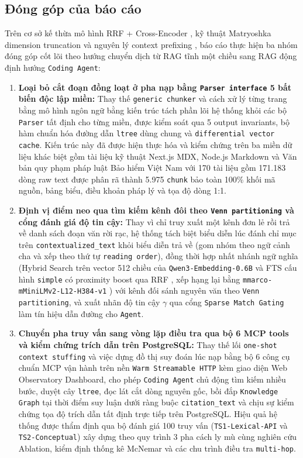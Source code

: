 \subsection{Đóng góp của báo cáo}
Trên cơ sở kế thừa mô hình RRF + Cross-Encoder \cite{cormack2009rrf, nogueira2019bert, wang2021minilm}, kỹ thuật Matryoshka dimension truncation \cite{kusupati2022mrl} và nguyên lý context prefixing \cite{anthropic2024contextual}, báo cáo thực hiện ba nhóm đóng góp cốt lõi theo hướng chuyển dịch từ RAG tĩnh một chiều sang RAG động định hướng \texttt{Coding Agent}:
\begin{enumerate}
    \item \textbf{Loại bỏ cắt đoạn đồng loạt ở pha nạp bằng \texttt{Parser interface} 5 bất biến độc lập miền:} Thay thế \texttt{generic chunker} và cách xử lý từng trang bằng mô hình ngôn ngữ bằng kiến trúc tách phần lõi hệ thống khỏi các bộ \texttt{Parser} tất định cho từng miền, được kiểm soát qua 5 output invariants, bộ hàm chuẩn hóa đường dẫn \texttt{ltree} dùng chung và \texttt{differential vector cache}. Kiến trúc này đã được hiện thực hóa và kiểm chứng trên ba miền dữ liệu khác biệt gồm tài liệu kỹ thuật Next.js MDX, Node.js Markdown và Văn bản quy phạm pháp luật Bảo hiểm Việt Nam với 170 tài liệu gồm 171.183 dòng raw text được phân rã thành 5.975 \texttt{chunk} bảo toàn 100\% khối mã nguồn, bảng biểu, điều khoản pháp lý và tọa độ dòng 1:1.
    \item \textbf{Định vị điểm neo qua tìm kiếm kênh đôi theo \texttt{Venn partitioning} và cổng đánh giá độ tin cậy:} Thay vì chỉ truy xuất một kênh đơn lẻ rồi trả về danh sách đoạn văn rời rạc, hệ thống tách biệt biểu diễn lúc đánh chỉ mục trên \texttt{contextualized\_text} khỏi biểu diễn trả về (gom nhóm theo ngữ cảnh cha và xếp theo thứ tự \texttt{reading order}), đồng thời hợp nhất nhánh ngữ nghĩa (Hybrid Search trên vector 512 chiều của \texttt{Qwen3-Embedding-0.6B} \cite{zhang2025qwen3} và FTS cấu hình \texttt{simple} có proximity boost qua RRF \cite{cormack2009rrf}, xếp hạng lại bằng \texttt{mmarco-mMiniLMv2-L12-H384-v1} \cite{wang2021minilm}) với kênh đối sánh nguyên văn theo \texttt{Venn partitioning}, và xuất nhãn độ tin cậy $\gamma$ qua cổng \texttt{Sparse Match Gating} làm tín hiệu dẫn đường cho \texttt{Agent}.
    \item \textbf{Chuyển pha truy vấn sang vòng lặp điều tra qua bộ 6 MCP tools và kiểm chứng trích dẫn trên PostgreSQL:} Thay thế lối \texttt{one-shot context stuffing} và việc dựng đồ thị suy đoán lúc nạp bằng bộ 6 công cụ chuẩn MCP \cite{anthropic2024mcp} vận hành trên nền \texttt{Warm Streamable HTTP} kèm giao diện Web Observatory Dashboard, cho phép \texttt{Coding Agent} chủ động tìm kiếm nhiều bước, duyệt cây \texttt{ltree}, đọc lát cắt dòng nguyên gốc, bồi đắp \texttt{Knowledge Graph} tại thời điểm suy luận dưới ràng buộc \texttt{citation\_text} và chịu sự kiểm chứng tọa độ trích dẫn tất định trực tiếp trên PostgreSQL. Hiệu quả hệ thống được thẩm định qua bộ đánh giá 100 truy vấn (\texttt{TS1-Lexical-API} và \texttt{TS2-Conceptual}) xây dựng theo quy trình 3 pha cách ly mù cùng nghiên cứu Ablation, kiểm định thống kê McNemar và các chu trình điều tra \texttt{multi-hop}.
\end{enumerate}
